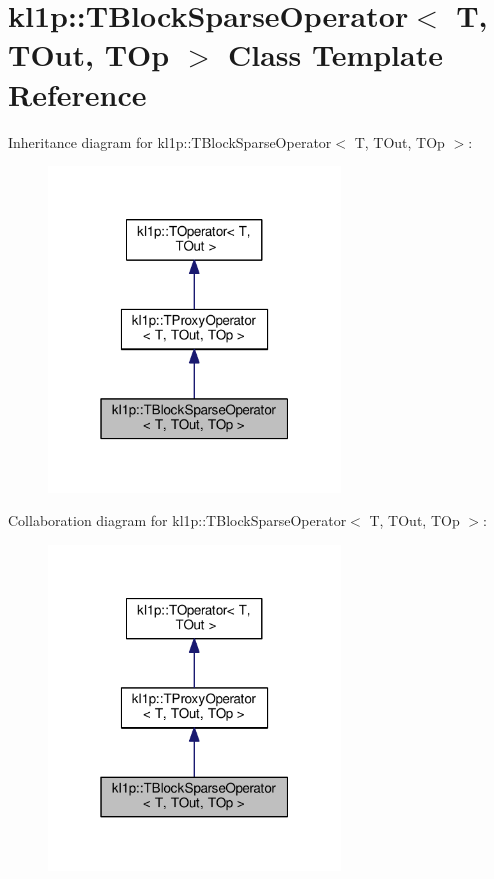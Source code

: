 \hypertarget{classkl1p_1_1TBlockSparseOperator}{}\section{kl1p\+:\+:T\+Block\+Sparse\+Operator$<$ T, T\+Out, T\+Op $>$ Class Template Reference}
\label{classkl1p_1_1TBlockSparseOperator}


Inheritance diagram for kl1p\+:\+:T\+Block\+Sparse\+Operator$<$ T, T\+Out, T\+Op $>$\+:
\nopagebreak
\begin{figure}[H]
\begin{center}
\leavevmode
\includegraphics[width=220pt]{classkl1p_1_1TBlockSparseOperator__inherit__graph}
\end{center}
\end{figure}


Collaboration diagram for kl1p\+:\+:T\+Block\+Sparse\+Operator$<$ T, T\+Out, T\+Op $>$\+:
\nopagebreak
\begin{figure}[H]
\begin{center}
\leavevmode
\includegraphics[width=220pt]{classkl1p_1_1TBlockSparseOperator__coll__graph}
\end{center}
\end{figure}

